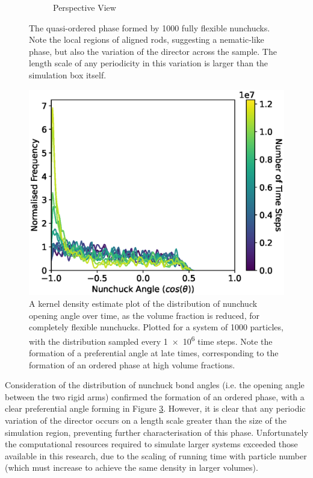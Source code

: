 \documentclass[11pt, a4paper]{article} %
\begin{document}
\begin{figure}
\begin{subfigure}{.5\textwidth}
		\caption{Perspective View}
		\label{fig:nun_fr_perspective}
	\end{subfigure}
	\caption{The quasi-ordered phase formed by \num{1000} fully flexible nunchucks. Note the local regions of aligned rods, suggesting a nematic-like phase, but also the variation of the director across the sample. The length scale of any periodicity in this variation is larger than the simulation box itself.}
	\label{fig:nun_fr_views}
\end{figure} %

\begin{figure} [h!]
	\centering
	\includegraphics[width=0.7\linewidth]{Figures/nun_fr_angledist}
	\caption{A kernel density estimate plot of the distribution of nunchuck opening angle over time, as the volume fraction is reduced, for completely flexible nunchucks. Plotted for a system of \num{1000} particles, with the distribution sampled every \num{1e6} time steps. Note the formation of a preferential angle at late times, corresponding to the formation of an ordered phase at high volume fractions.}
	\label{fig:nun_fr_angledist}
\end{figure}  %

Consideration of the distribution of nunchuck bond angles (i.e. the opening angle between the two rigid arms) confirmed the formation of an ordered phase, with a clear preferential angle forming in Figure \ref{fig:nun_fr_angledist}. However, it is clear that any periodic variation of the director occurs on a length scale greater than the size of the simulation region, preventing further characterisation of this phase. Unfortunately the computational resources required to simulate larger systems exceeded those available in this research, due to the scaling of running time with particle number (which must increase to achieve the same density in larger volumes). 
\end{document}
